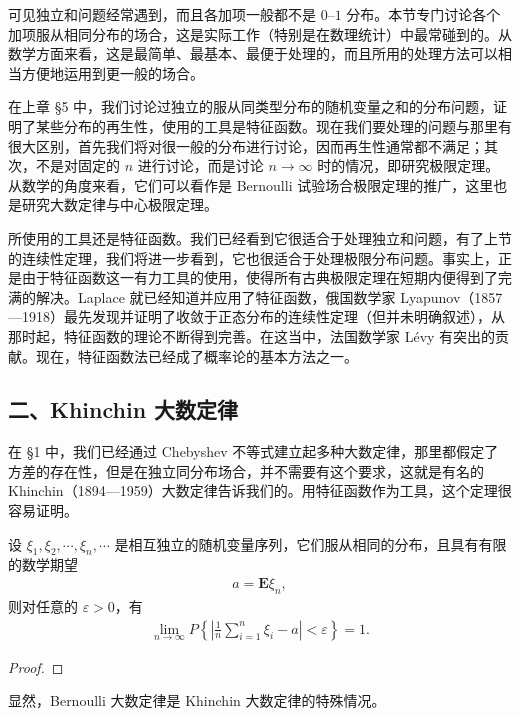 \documentclass[../../main.tex]{subfiles}
\begin{document}
可见独立和问题经常遇到，而且各加项一般都不是 $0$--$1$ 分布。本节专门讨论各个加项服从相同分布的场合，这是实际工作（特别是在数理统计）中最常碰到的。从数学方面来看，这是最简单、最基本、最便于处理的，而且所用的处理方法可以相当方便地运用到更一般的场合。

在上章 \S5 中，我们讨论过独立的服从同类型分布的随机变量之和的分布问题，证明了某些分布的再生性，使用的工具是特征函数。现在我们要处理的问题与那里有很大区别，首先我们将对很一般的分布进行讨论，因而再生性通常都不满足；其次，不是对固定的 $n$ 进行讨论，而是讨论 $n\to\infty$ 时的情况，即研究极限定理。从数学的角度来看，它们可以看作是 Bernoulli 试验场合极限定理的推广，这里也是研究大数定律与中心极限定理。

所使用的工具还是特征函数。我们已经看到它很适合于处理独立和问题，有了上节的连续性定理，我们将进一步看到，它也很适合于处理极限分布问题。事实上，正是由于特征函数这一有力工具的使用，使得所有古典极限定理在短期内便得到了完满的解决。Laplace 就已经知道并应用了特征函数，俄国数学家 Lyapunov（1857—1918）最先发现并证明了收敛于正态分布的连续性定理（但并未明确叙述），从那时起，特征函数的理论不断得到完善。在这当中，法国数学家 Lévy 有突出的贡献。现在，特征函数法已经成了概率论的基本方法之一。

\subsection*{二、Khinchin 大数定律}

在 \S1 中，我们已经通过 Chebyshev 不等式建立起多种大数定律，那里都假定了方差的存在性，但是在独立同分布场合，并不需要有这个要求，这就是有名的 Khinchin（1894—1959）大数定律告诉我们的。用特征函数作为工具，这个定理很容易证明。

\begin{theorem}\label{theorem:ch05-Khinchin大数定律}
设 $\xi_1,\xi_2,\cdots,\xi_n,\cdots$ 是相互独立的随机变量序列，它们服从相同的分布，且具有有限的数学期望
\begin{align*}
a=\boldsymbol{E}\xi_n,
\end{align*}
则对任意的 $\varepsilon>0$，有
\begin{align}
\lim_{n\to\infty}P\!\left\{\left|\frac1n\sum_{i=1}^{n}\xi_i-a\right|<\varepsilon\right\}=1.
\end{align}
\end{theorem}

\begin{proof}
\end{proof}

显然，Bernoulli 大数定律是 Khinchin 大数定律的特殊情况。
\end{document}
